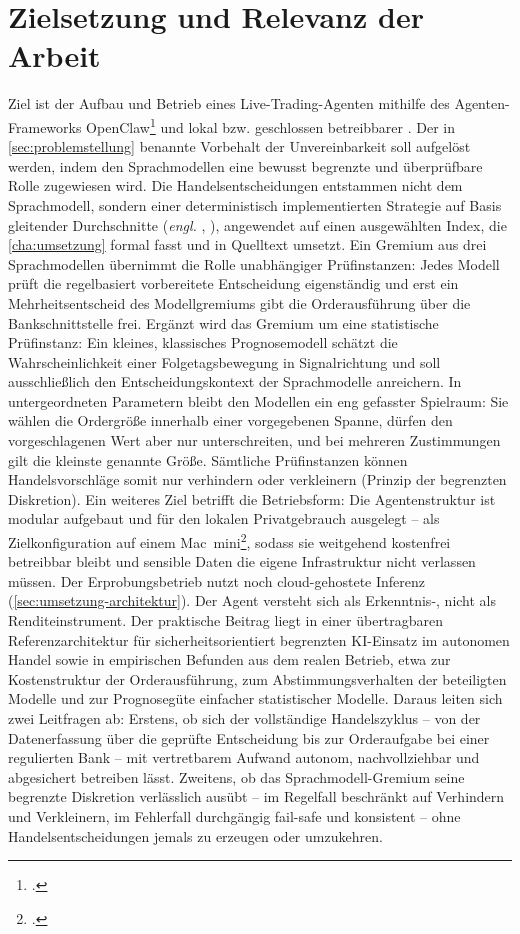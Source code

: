 \section{Zielsetzung und Relevanz der Arbeit}
\label{sec:zielsetzung}

Ziel ist der Aufbau und Betrieb eines Live-Trading-Agenten
mithilfe des Agenten-Frameworks OpenClaw\footcite[vgl.][]{openclawRepo2026} und lokal
bzw. geschlossen betreibbarer . Der in \cref{sec:problemstellung}
benannte Vorbehalt der Unvereinbarkeit soll aufgelöst werden, indem den
Sprachmodellen eine bewusst begrenzte und überprüfbare Rolle zugewiesen wird. 
Die Handelsentscheidungen entstammen nicht dem
Sprachmodell, sondern einer deterministisch implementierten Strategie
auf Basis gleitender Durchschnitte (\textit{engl.} , ),
angewendet auf einen ausgewählten Index, die \cref{cha:umsetzung} formal fasst und in
Quelltext umsetzt. Ein Gremium aus drei Sprachmodellen übernimmt die Rolle unabhängiger Prüfinstanzen: Jedes Modell
prüft die regelbasiert vorbereitete Entscheidung eigenständig und erst ein
Mehrheitsentscheid des Modellgremiums gibt die Orderausführung über die
Bankschnittstelle frei. Ergänzt
wird das Gremium um eine statistische Prüfinstanz: Ein kleines, klassisches
Prognosemodell schätzt die Wahrscheinlichkeit einer Folgetagsbewegung in
Signalrichtung und soll ausschließlich den Entscheidungskontext der
Sprachmodelle anreichern. In untergeordneten Parametern bleibt den Modellen ein eng
gefasster Spielraum: Sie wählen die Ordergröße innerhalb einer vorgegebenen Spanne,
dürfen den vorgeschlagenen Wert aber nur unterschreiten, und bei mehreren Zustimmungen
gilt die kleinste genannte Größe.
Sämtliche Prüfinstanzen können Handelsvorschläge somit nur verhindern oder verkleinern (Prinzip der begrenzten Diskretion). Ein weiteres Ziel betrifft die Betriebsform: Die Agentenstruktur ist modular aufgebaut und für den lokalen
Privatgebrauch ausgelegt -- als Zielkonfiguration auf einem Mac~mini\footcite[vgl.][]{appleMacmini2026}, sodass sie weitgehend kostenfrei betreibbar bleibt und sensible Daten die eigene Infrastruktur nicht verlassen müssen. Der Erprobungsbetrieb nutzt noch cloud-gehostete Inferenz (\cref{sec:umsetzung-architektur}). Der Agent versteht sich als Erkenntnis-, nicht als Renditeinstrument.
Der praktische Beitrag liegt in einer übertragbaren Referenzarchitektur
für sicherheitsorientiert begrenzten KI-Einsatz im autonomen Handel sowie in
empirischen Befunden aus dem realen Betrieb, etwa zur Kostenstruktur der
Orderausführung, zum Abstimmungsverhalten der beteiligten Modelle und zur
Prognosegüte einfacher statistischer Modelle. Daraus leiten sich zwei Leitfragen ab:
Erstens, ob sich der vollständige Handelszyklus -- von der Datenerfassung über die geprüfte Entscheidung bis zur Orderaufgabe bei einer regulierten Bank -- mit
vertretbarem Aufwand autonom, nachvollziehbar und abgesichert betreiben lässt.
Zweitens, ob das Sprachmodell-Gremium seine begrenzte Diskretion verlässlich ausübt -- im Regelfall beschränkt auf Verhindern und Verkleinern, im Fehlerfall durchgängig fail-safe und konsistent -- ohne Handelsentscheidungen jemals zu erzeugen oder umzukehren.

